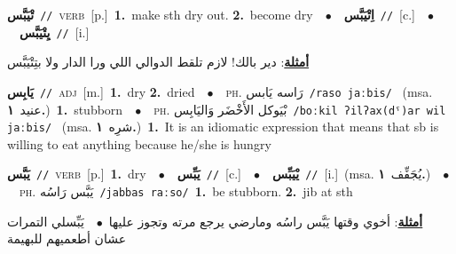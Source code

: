 \documentclass[10pt,a4paper,twoside]{article} %
\begin{document}
\begin{multicols}{2}
{\setlength\topsep{0pt}\textbf{\foreignlanguage{arabic}{تْيَبَّس}}\ {\color{gray}\texttt{//}\color{black}}\ \textsc{verb}\ [p.]\ \textbf{1.}~make sth dry out.  \textbf{2.}~become dry\ \ $\bullet$\ \ \setlength\topsep{0pt}\textbf{\foreignlanguage{arabic}{اِتْيَبَّس}}\ {\color{gray}\texttt{//}\color{black}}\ [c.]\ \ $\bullet$\ \ \setlength\topsep{0pt}\textbf{\foreignlanguage{arabic}{يِتْيَبَّس}}\ {\color{gray}\texttt{//}\color{black}}\ [i.]\  \begin{flushright}\color{gray}\foreignlanguage{arabic}{\textbf{\underline{\foreignlanguage{arabic}{أمثلة}}}: دير بالك! لازم تلقط الدوالي اللي ورا الدار ولا بتِتْيَبَّس}\end{flushright}\color{black}} \vspace{2mm}

{\setlength\topsep{0pt}\textbf{\foreignlanguage{arabic}{يَابِس}}\ {\color{gray}\texttt{//}\color{black}}\ \textsc{adj}\ [m.]\ \textbf{1.}~dry  \textbf{2.}~dried\ \ $\bullet$\ \ \textsc{ph.} \color{gray} \foreignlanguage{arabic}{رَاسه يَابس}\color{black}\ {\color{gray}\texttt{/{\sffamily raso jaːbis}/}\color{black}}\ \color{gray} (msa. \foreignlanguage{arabic}{عنيد}~\foreignlanguage{arabic}{\textbf{١.}})\color{black}\ \textbf{1.}~stubborn\ \ $\bullet$\ \ \textsc{ph.} \color{gray} \foreignlanguage{arabic}{بْيَوكل الأَخْضَر وَاليَابِس}\color{black}\ {\color{gray}\texttt{/{\sffamily boːkil ʔilʔax(dˤ)ar wil jaːbis}/}\color{black}}\ \color{gray} (msa. \foreignlanguage{arabic}{شرِه}~\foreignlanguage{arabic}{\textbf{١.}})\color{black}\ \textbf{1.}~It is an idiomatic expression that means that sb is willing to eat anything because he/she is hungry\ } \vspace{2mm}

{\setlength\topsep{0pt}\textbf{\foreignlanguage{arabic}{يَبَّس}}\ {\color{gray}\texttt{//}\color{black}}\ \textsc{verb}\ [p.]\ \textbf{1.}~dry\ \ $\bullet$\ \ \setlength\topsep{0pt}\textbf{\foreignlanguage{arabic}{يَبِّس}}\ {\color{gray}\texttt{//}\color{black}}\ [c.]\ \ $\bullet$\ \ \setlength\topsep{0pt}\textbf{\foreignlanguage{arabic}{يْيَبِّس}}\ {\color{gray}\texttt{//}\color{black}}\ [i.]\ \color{gray}(msa. \foreignlanguage{arabic}{يُجَفِّف}~\foreignlanguage{arabic}{\textbf{١.}})\color{black}\ \ $\bullet$\ \ \textsc{ph.} \color{gray} \foreignlanguage{arabic}{يَبَّس رَاسُه}\color{black}\ {\color{gray}\texttt{/{\sffamily jabbas raːso}/}\color{black}}\ \textbf{1.}~be stubborn.  \textbf{2.}~jib at sth\  \begin{flushright}\color{gray}\foreignlanguage{arabic}{\textbf{\underline{\foreignlanguage{arabic}{أمثلة}}}: أخوي وقتها يَبَّس راسُه ومارضي يرجع مرته وتجوز عليها\ $\bullet$\ \  يَبِّسلي التمرات عشان أطعميهم للبهيمة}\end{flushright}\color{black}} \vspace{2mm}


\end{multicols}
\end{document}

